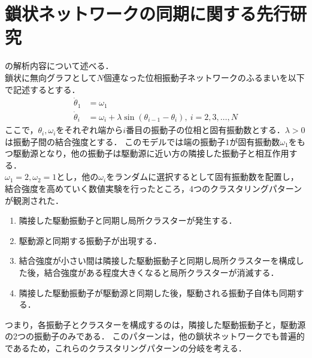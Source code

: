 \documentclass[../main]{subfiles}
\begin{document}
\chapter{鎖状ネットワークの同期に関する先行研究}
\label{chap:appendix}
\cite{XiaHuang:130506}の解析内容について述べる．\\
鎖状に無向グラフとして$N$個連なった位相振動子ネットワークのふるまいを以下で記述するとする．
\begin{align*}
    \dot{\theta}_1&=\omega_1\\
    \dot{\theta}_i&=\omega_i+\lambda\sin(\theta_{i-1}-\theta_i),\ i=2,3,\ldots,N
\end{align*}
ここで，$\theta_i,\omega_i$をそれぞれ端から$i$番目の振動子の位相と固有振動数とする．$\lambda>0$は振動子間の結合強度とする．
このモデルでは端の振動子$1$が固有振動数$\omega_1$をもつ駆動源となり，他の振動子は駆動源に近い方の隣接した振動子と相互作用する．\\

$\omega_1=2,\omega_2=1$とし，他の$\omega_i$をランダムに選択するとして固有振動数を配置し，結合強度を高めていく数値実験を行ったところ，4つのクラスタリングパターンが観測された．
\renewcommand{\labelenumi}{Case  \theenumi}
\begin{enumerate}
    \item \label{enu:case1} 隣接した駆動振動子と同期し局所クラスターが発生する．
    \item \label{enu:case2} 駆動源と同期する振動子が出現する．
    \item \label{enu:case3} 結合強度が小さい間は隣接した駆動振動子と同期し局所クラスターを構成した後，結合強度がある程度大きくなると局所クラスターが消滅する．
    \item \label{enu:case4} 隣接した駆動振動子が駆動源と同期した後，駆動される振動子自体も同期する．
\end{enumerate}
つまり，各振動子とクラスターを構成するのは，隣接した駆動振動子と，駆動源の2つの振動子のみである．
このパターンは，他の鎖状ネットワークでも普遍的であるため，これらのクラスタリングパターンの分岐を考える．
\end{document}
